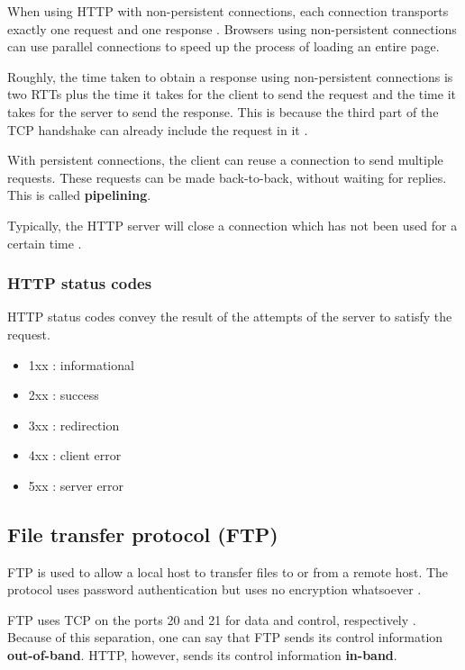 When using HTTP with non-persistent connections, each connection transports exactly one request and one response \cite[p.~101]{computer-networking-kurose-2012}.
Browsers using non-persistent connections can use parallel connections to speed up the process of loading an entire page.

Roughly, the time taken to obtain a response using non-persistent connections is two RTTs plus the time it takes for the client to send the request and the time it takes for the server to send the response.
This is because the third part of the TCP handshake can already include the request in it \cite[p.~102]{computer-networking-kurose-2012}.

With persistent connections, the client can reuse a connection to send multiple requests. These requests can be made back-to-back, without waiting for replies.
This is called \textbf{pipelining}.

Typically, the HTTP server will close a connection which has not been used for a certain time \cite[p.~103]{computer-networking-kurose-2012}.

\subsubsection{HTTP status codes}

HTTP status codes convey the result of the attempts of the server to satisfy the request.

\begin{itemize}
 \item 1xx : informational
 \item 2xx : success
 \item 3xx : redirection
 \item 4xx : client error
 \item 5xx : server error
\end{itemize}

\subsection{File transfer protocol (FTP)}

FTP is used to allow a local host to transfer files to or from a remote host. The protocol uses password authentication but uses no encryption whatsoever \cite[p.~116]{computer-networking-kurose-2012}.

FTP uses TCP on the ports 20 and 21 for data and control, respectively \cite[p.~117]{computer-networking-kurose-2012}. Because of this separation, one can say that FTP sends its control information \textbf{out-of-band}. HTTP, however, sends its control information \textbf{in-band}.

